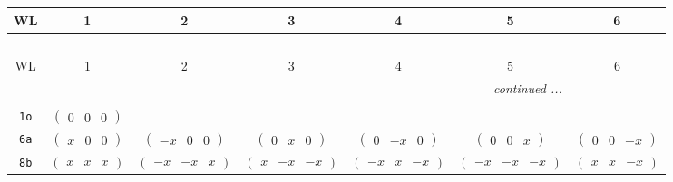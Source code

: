 \documentclass[fleqn,9pt,landscape]{jsarticle}
\begin{document}
\begin{center}
\renewcommand{\arraystretch}{1.2}
\begin{longtable}{ccccccc}
 \hline \hline
WL & 1 & 2 & 3 & 4 & 5 & 6 \\ \hline \endfirsthead

\multicolumn{6}{l}{\tablename\ \thetable{}} \\
 \hline \hline
WL & 1 & 2 & 3 & 4 & 5 & 6 \\ \hline \endhead

 \hline \hline
\multicolumn{6}{r}{\footnotesize\it continued ...} \\ \endfoot

 \hline \hline
\multicolumn{6}{r}{} \\ \endlastfoot

{\tt 1o} & $ \begin{pmatrix} 0 & 0 & 0 \end{pmatrix} $ & $  $ & $  $ & $  $ & $  $ & $  $ \\ \hline
{\tt 6a} & $ \begin{pmatrix} x & 0 & 0 \end{pmatrix} $ & $ \begin{pmatrix} - x & 0 & 0 \end{pmatrix} $ & $ \begin{pmatrix} 0 & x & 0 \end{pmatrix} $ & $ \begin{pmatrix} 0 & - x & 0 \end{pmatrix} $ & $ \begin{pmatrix} 0 & 0 & x \end{pmatrix} $ & $ \begin{pmatrix} 0 & 0 & - x \end{pmatrix} $ \\ \hline
{\tt 8b} & $ \begin{pmatrix} x & x & x \end{pmatrix} $ & $ \begin{pmatrix} - x & - x & x \end{pmatrix} $ & $ \begin{pmatrix} x & - x & - x \end{pmatrix} $ & $ \begin{pmatrix} - x & x & - x \end{pmatrix} $ & $ \begin{pmatrix} - x & - x & - x \end{pmatrix} $ & $ \begin{pmatrix} x & x & - x \end{pmatrix} $ \\

\end{longtable}
\end{center}
\end{document}

